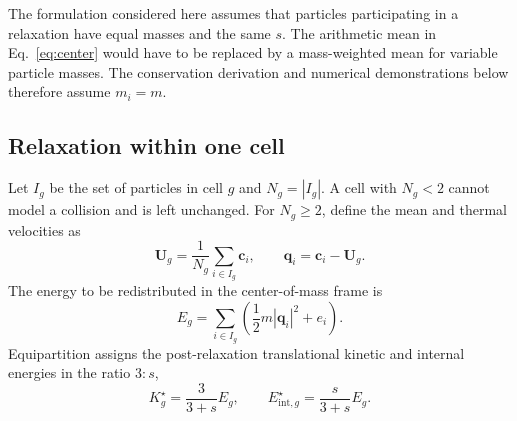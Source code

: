 \documentclass[a4paper,11pt]{article}
\newcommand{\vect}[1]{\bm{#1}}
\begin{document}
The formulation considered here assumes that particles participating in a
relaxation have equal masses and the same $s$.  The arithmetic mean in
Eq.~\eqref{eq:center} would have to be replaced by a mass-weighted mean for
variable particle masses.  The conservation derivation and numerical
demonstrations below therefore assume $m_i=m$.

\subsection{Relaxation within one cell}

Let $I_g$ be the set of particles in cell $g$ and $N_g=|I_g|$.  A cell with
$N_g<2$ cannot model a collision and is left unchanged.  For $N_g\geq2$, define
the mean and thermal velocities as
\begin{equation}
 \vect{U}_g=\frac{1}{N_g}\sum_{i\in I_g}\vect{c}_i,
 \qquad
 \vect{q}_i=\vect{c}_i-\vect{U}_g.
 \label{eq:center}
\end{equation}
The energy to be redistributed in the center-of-mass frame is
\begin{equation}
 E_g=\sum_{i\in I_g}
 \left(\frac12m|\vect{q}_i|^2+e_i\right).
 \label{eq:cellenergy}
\end{equation}
Equipartition assigns the post-relaxation translational kinetic and internal
energies in the ratio $3:s$,
\begin{equation}
 K_g^{\star}=\frac{3}{3+s}E_g,
 \qquad
 E_{\mathrm{int},g}^{\star}=\frac{s}{3+s}E_g.
 \label{eq:partition}
\end{equation}
\end{document}
